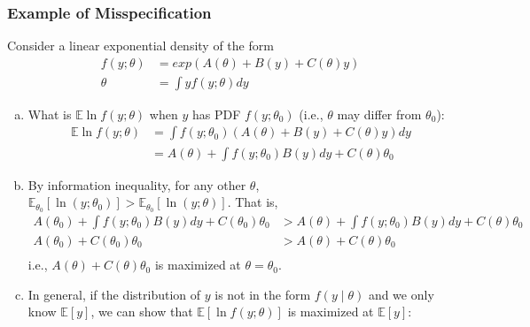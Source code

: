 \documentclass[11pt]{elegantbook}
\begin{document}
\subsubsection*{Example of Misspecification}
\begin{example}
    Consider a linear exponential density of the form
    \begin{equation}
        \begin{aligned}
            f(y;\theta)&=exp\left(A(\theta)+B(y)+C(\theta)y\right)\\
            \theta&=\int yf(y;\theta)dy
        \end{aligned}
        \nonumber
    \end{equation}
\end{example}
\begin{enumerate}[(a).]
    \item What is $\mathbb{E} \ln f(y ; \theta)$ when $y$ has PDF $f(y ; \theta_0)$ (i.e., $\theta$ may differ from $\theta_0$):
    \begin{equation}
        \begin{aligned}
            \mathbb{E}\ln f(y;\theta)&=\int f(y ; \theta_0) \left(A(\theta)+B(y)+C(\theta)y\right)dy\\
            &=A(\theta)+\int f(y ; \theta_0)B(y)dy+C(\theta)\theta_0
        \end{aligned}
        \nonumber
    \end{equation}
    \item By information inequality, for any other $\theta$, $\mathbb{E}_{\theta_0}[\ln (y;\theta_0)]>\mathbb{E}_{\theta_0}[\ln (y;\theta)]$. That is,
    \begin{equation}
        \begin{aligned}
            A(\theta_0)+\int f(y ; \theta_0)B(y)dy+C(\theta_0)\theta_0&>A(\theta)+\int f(y ; \theta_0)B(y)dy+C(\theta)\theta_0\\
            A(\theta_0)+C(\theta_0)\theta_0&>A(\theta)+C(\theta)\theta_0\\
        \end{aligned}
        \nonumber
    \end{equation}
    i.e., $A(\theta)+C(\theta)\theta_0$ is maximized at $\theta=\theta_0$.
    \item In general, if the distribution of $y$ is not in the form $f(y\mid \theta)$ and we only know $\mathbb{E}[y]$, we can show that $\mathbb{E}[\ln f(y;\theta)]$ is maximized at $\mathbb{E}[y]$:
    \begin{equation}

\end{equation}
\end{enumerate}
\end{document}

